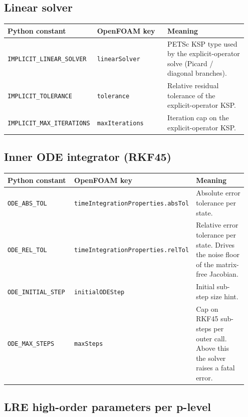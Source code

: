 \documentclass[11pt,a4paper]{article}
\newcommand{\code}[1]{\texttt{\small #1}}
\begin{document}
\subsection{Linear solver}
\begin{longtable}{@{}p{0.30\linewidth}p{0.30\linewidth}p{0.35\linewidth}@{}}
\toprule
Python constant & OpenFOAM key & Meaning \\
\midrule \endhead
\code{IMPLICIT\_LINEAR\_SOLVER} & \code{linearSolver} &
   PETSc KSP type used by the explicit-operator solve
   (Picard / diagonal branches). \\
\code{IMPLICIT\_TOLERANCE} & \code{tolerance} &
   Relative residual tolerance of the explicit-operator KSP. \\
\code{IMPLICIT\_MAX\_ITERATIONS} & \code{maxIterations} &
   Iteration cap on the explicit-operator KSP. \\
\bottomrule
\end{longtable}

\subsection{Inner ODE integrator (RKF45)}
\begin{longtable}{@{}p{0.30\linewidth}p{0.30\linewidth}p{0.35\linewidth}@{}}
\toprule
Python constant & OpenFOAM key & Meaning \\
\midrule \endhead
\code{ODE\_ABS\_TOL} & \code{timeIntegrationProperties.absTol} &
   Absolute error tolerance per state. \\
\code{ODE\_REL\_TOL} & \code{timeIntegrationProperties.relTol} &
   Relative error tolerance per state. Drives the noise floor
   of the matrix-free Jacobian. \\
\code{ODE\_INITIAL\_STEP} & \code{initialODEStep} &
   Initial sub-step size hint. \\
\code{ODE\_MAX\_STEPS} & \code{maxSteps} &
   Cap on RKF45 sub-steps per outer call. Above this
   the solver raises a fatal error. \\
\bottomrule
\end{longtable}

\subsection{LRE high-order parameters per p-level}
\end{document}
